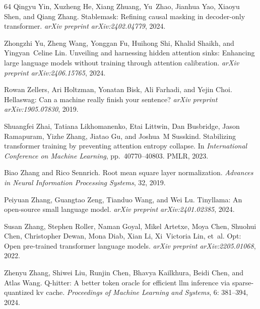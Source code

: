 \documentclass{article} \usepackage{iclr2025_conference,times}
\begin{document}
\begin{thebibliography}{64}
Qingyu Yin, Xuzheng He, Xiang Zhuang, Yu~Zhao, Jianhua Yao, Xiaoyu Shen, and Qiang Zhang.
\newblock Stablemask: Refining causal masking in decoder-only transformer.
\newblock \emph{arXiv preprint arXiv:2402.04779}, 2024.

Zhongzhi Yu, Zheng Wang, Yonggan Fu, Huihong Shi, Khalid Shaikh, and Yingyan~Celine Lin.
\newblock Unveiling and harnessing hidden attention sinks: Enhancing large language models without training through attention calibration.
\newblock \emph{arXiv preprint arXiv:2406.15765}, 2024.

Rowan Zellers, Ari Holtzman, Yonatan Bisk, Ali Farhadi, and Yejin Choi.
\newblock Hellaswag: Can a machine really finish your sentence?
\newblock \emph{arXiv preprint arXiv:1905.07830}, 2019.

Shuangfei Zhai, Tatiana Likhomanenko, Etai Littwin, Dan Busbridge, Jason Ramapuram, Yizhe Zhang, Jiatao Gu, and Joshua~M Susskind.
\newblock Stabilizing transformer training by preventing attention entropy collapse.
\newblock In \emph{International Conference on Machine Learning}, pp.\  40770--40803. PMLR, 2023.

Biao Zhang and Rico Sennrich.
\newblock Root mean square layer normalization.
\newblock \emph{Advances in Neural Information Processing Systems}, 32, 2019.

Peiyuan Zhang, Guangtao Zeng, Tianduo Wang, and Wei Lu.
\newblock Tinyllama: An open-source small language model.
\newblock \emph{arXiv preprint arXiv:2401.02385}, 2024{}.

Susan Zhang, Stephen Roller, Naman Goyal, Mikel Artetxe, Moya Chen, Shuohui Chen, Christopher Dewan, Mona Diab, Xian Li, Xi~Victoria Lin, et~al.
\newblock Opt: Open pre-trained transformer language models.
\newblock \emph{arXiv preprint arXiv:2205.01068}, 2022.

Zhenyu Zhang, Shiwei Liu, Runjin Chen, Bhavya Kailkhura, Beidi Chen, and Atlas Wang.
\newblock Q-hitter: A better token oracle for efficient llm inference via sparse-quantized kv cache.
\newblock \emph{Proceedings of Machine Learning and Systems}, 6: 381--394, 2024{}.

\end{thebibliography}
 
\end{document}
